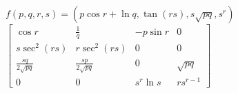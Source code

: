 {
$f(p,q,r,s) = (p\cos r+\ln q, \tan (rs), s\sqrt{pq}, s^r)$
}
{
$\begin{bmatrix}
\cos r & \frac{1}{q} & -p\sin r & 0\\
s\sec^2 (rs) & r\sec^2(rs) & 0 &0 \\
\frac{sq}{2\sqrt{pq}} & \frac{sp}{2\sqrt{pq}} & 0 &\sqrt{pq}\\
0 & 0& s^r \ln s & rs^{r-1} 
\end{bmatrix}$
}
